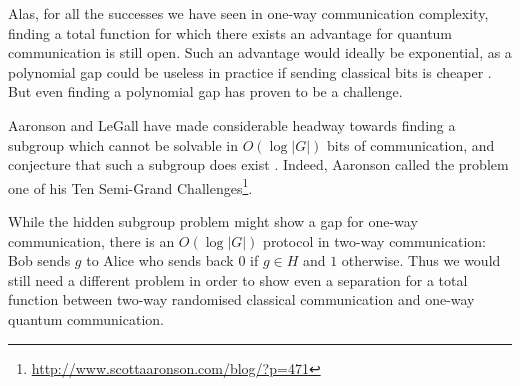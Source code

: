 \documentclass[a4paper]{article}
\begin{document}
        Alas, for all the successes we have seen in one-way communication complexity, finding a total function for which there exists an advantage for quantum communication is still open. Such an advantage would ideally be exponential, as a polynomial gap could be useless in practice if sending classical bits is cheaper \cite{RevModPhys.82.665}. But even finding a polynomial gap has proven to be a challenge.

        Aaronson and LeGall have made considerable headway towards finding a subgroup which cannot be solvable in $O(\log |G|)$ bits of communication, and conjecture that such a subgroup does exist \cite{0902.3175}. Indeed, Aaronson called the problem one of his Ten Semi-Grand Challenges\footnote{\url{http://www.scottaaronson.com/blog/?p=471}}.

        While the hidden subgroup problem might show a gap for one-way communication, there is an $O(\log|G|)$ protocol in two-way communication: Bob sends $g$ to Alice who sends back $0$ if $g \in H$ and $1$ otherwise. Thus we would still need a different problem in order to show even a separation for a total function between two-way randomised classical communication and one-way quantum communication.

    
    {}
\end{document}
